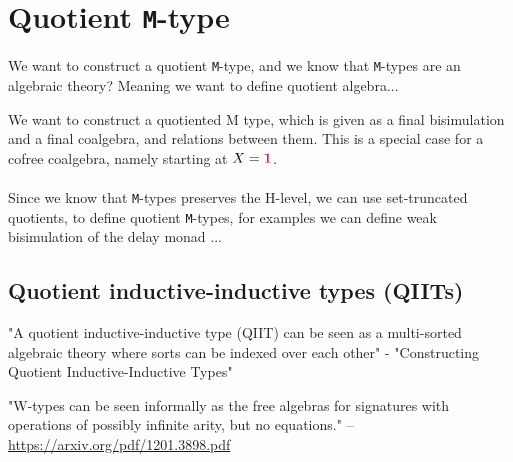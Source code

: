 \documentclass[twoside,11pt,openright]{report}
\theoremstyle{plain} %
\theoremstyle{definition}
\theoremstyle{remark}
\newcommand*{\type}[1]{\textcolor{magenta!90!black}{#1}}
\newcommand*{\unit}{\type{\textbf{1}}}
\begin{document}
\section{Quotient \texttt{M}-type}
We want to construct a quotient \texttt{M}-type, and we know that \texttt{M}-types are an algebraic theory? Meaning we want to define quotient algebra...

We want to construct a quotiented M type, which is given as a final bisimulation and a final coalgebra, and relations between them. This is a special case for a cofree coalgebra, namely starting at \(X = \unit\).
\\ \\
Since we know that \texttt{M}-types preserves the H-level, we can use set-truncated quotients, to define quotient \texttt{M}-types, for examples we can define weak bisimulation of the delay monad ...

\subsection{Quotient inductive-inductive types (QIITs)}
"A quotient inductive-inductive type (QIIT) can be seen as a multi-sorted algebraic theory where sorts can be indexed over each other" - "Constructing Quotient Inductive-Inductive Types"

"W-types can be seen informally as the free algebras for signatures with operations of possibly infinite arity, but no equations." -- \url{https://arxiv.org/pdf/1201.3898.pdf}
\end{document}
